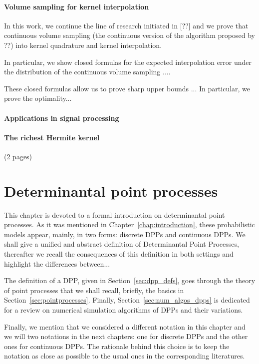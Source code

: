 \documentclass[twoside,11pt]{book}
\numberwithin{theorem}{chapter}
\numberwithin{definition}{chapter}
\numberwithin{proposition}{chapter}
\numberwithin{corollary}{chapter}
\numberwithin{example}{chapter}
\numberwithin{lemma}{chapter}
\begin{document}
\subsubsection{Volume sampling for kernel interpolation}
In this work, we continue the line of research initiated in [??] and we prove that continuous volume sampling (the continuous version of the algorithm proposed by ??) into kernel quadrature and kernel interpolation.

In particular, we show closed formulas for the expected interpolation error under the distribution of the continuous volume sampling ....

These closed formulas allow us to prove sharp upper bounds ... In particular, we prove the optimality...

\subsubsection{Applications in signal processing}
\subsubsection{The richest Hermite kernel}
(2 pages)

\clearpage
\chapter{Determinantal point processes}\label{chapter:dpp}

This chapter is devoted to a formal introduction on determinantal point processes. As it was mentioned in Chapter~\ref{chap:introduction}, these probabilistic models appear, mainly, in two forms: discrete DPPs and continuous DPPs. We shall give a unified and abstract definition of Determinantal Point Processes, thereafter we recall the consequences of this definition in both settings and highlight the differences between...

The definition of a DPP, given in Section~\ref{sec:dpp_defs}, goes through the theory of point processes that we shall recall, briefly, the basics in Section~\ref{sec:pointprocesses}. Finally, Section~\ref{sec:num_algos_dpps} is dedicated for a review on numerical simulation algorithms of DPPs and their variations.

Finally, we mention that we considered a different notation in this chapter and we will two notations in the next chapters: one for discrete DPPs and the other ones for continuous DPPs. The rationale behind this choice is to keep the notation as close as possible to the usual ones in the corresponding literatures.
\end{document}
